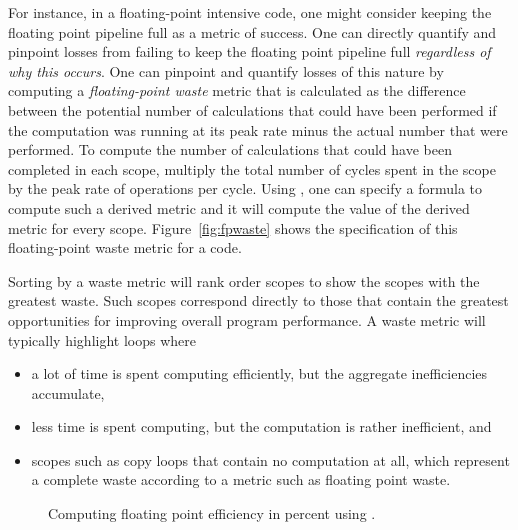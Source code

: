 \documentclass[11pt,letterpaper]{report}
\begin{document}
For instance, in a floating-point intensive code, one might consider keeping the floating point pipeline full as a metric of success.
One can directly quantify and pinpoint losses from failing to keep the floating point pipeline full {\em regardless of why this occurs}.
One can pinpoint and quantify losses of this nature by computing a {\em floating-point waste} metric that is calculated as the difference between the potential number of calculations that could have been performed if the computation was running at its peak rate minus the actual number that were performed.
To compute the number of calculations that could have been completed in each scope, multiply the total number of cycles spent in the scope by the peak rate of operations per cycle.
Using \hpcviewer{}, one can specify a formula to compute such a derived metric and it will compute the value of the derived metric for every scope.
Figure~\ref{fig:fpwaste} shows the specification of this floating-point waste metric for a code.

Sorting by a waste metric will rank order scopes to show the scopes with the greatest waste.
Such scopes correspond directly to those that contain the greatest opportunities for improving overall program performance.
A waste metric will typically highlight loops where
\begin{itemize}
\item a lot of time is spent computing efficiently, but the aggregate inefficiencies accumulate,
\item less time is spent computing, but the computation is rather inefficient, and
\item scopes such as copy loops that contain no computation at all, which represent a complete waste according to a metric such as floating point waste.
\end{itemize}

\begin{figure}[t]
\caption{Computing floating point efficiency in percent using \hpcviewer{}.}
\label{fig:fpefficiency}
\end{figure}
\end{document}
